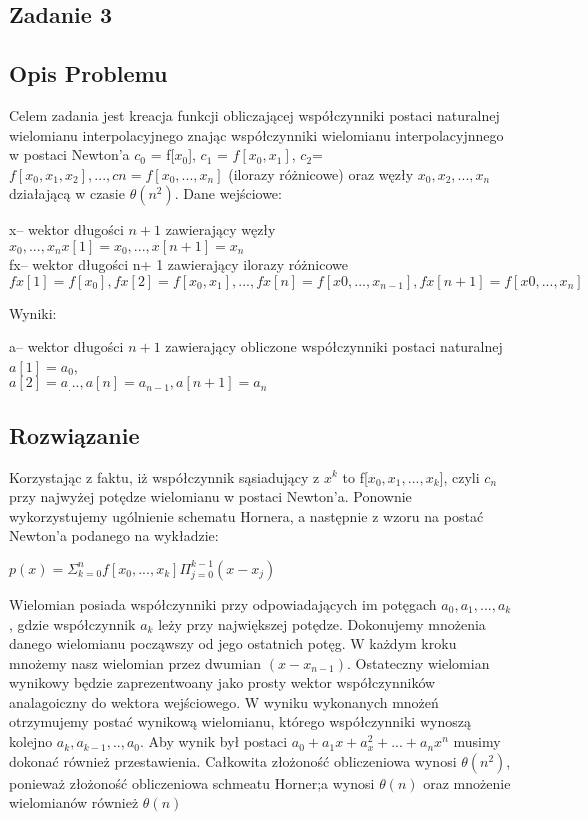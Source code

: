 \documentclass[11pt]{article}
\begin{document}
\begin{flushleft}
\section{Zadanie 3}
\subsection{Opis Problemu}
Celem zadania jest kreacja funkcji obliczającej współczynniki postaci naturalnej wielomianu interpolacyjnego znając współczynniki wielomianu interpolacyjnnego w postaci Newton'a $c_0$ = f[$x_0$], $c_1$ = $f[x_0,x_1]$, $c_2$= $f[x_0, x_1, x_2],. . .,cn=f[x_0, . . . , x_n]$ (ilorazy różnicowe) oraz węzły $ x_0, x_2, . . . , x_n $ działającą w czasie $\theta(n^2)$. Dane wejściowe:\\
\begin{center}
x– wektor długości $n+ 1 $ zawierający węzły $x_0, . . . , x_n x[1]=x_0,...,x[n+1]=x_n$ \\
fx– wektor długości n+ 1 zawierający ilorazy różnicowe $fx[1]=f[x_0],fx[2]=f[x_0, x_1],...,fx[n]=f[x0, . . . , x_{n−1}],fx[n+1]=f[x0, . . . , x_n]$\\
\begin{flushleft}
Wyniki:\\
\end{flushleft}
a– wektor długości $n+ 1 $ zawierający obliczone współczynniki postaci naturalnej\\
$a[1]=a_0$,\\
$a[2]=a_...,a[n]=a_{n−1},a[n+1]=a_n$
\end{center}
\bigskip
\subsection{Rozwiązanie}
\bigskip
Korzystając z faktu, iż współczynnik sąsiadujący z $x^k$ to f[$x_0,x_1,...,x_k$], czyli $c_n$ przy najwyżej potędze wielomianu w postaci Newton'a. Ponownie wykorzystujemy ugólnienie schematu Hornera, a następnie z wzoru na postać Newton'a podanego na  wykładzie: \\
\begin{center}
\bigskip
$p(x) = \Sigma^n_{k=0} f[x_0,...,x_k] \Pi^{k-1}_{j=0}(x-x_j)$\\
\bigskip
\end{center}
Wielomian posiada współczynniki przy odpowiadających im potęgach $a_0,a_1,...,a_k$, gdzie współczynnik $a_k$ leży przy największej potędze. Dokonujemy mnożenia danego wielomianu począwszy od jego ostatnich potęg. W każdym kroku mnożemy nasz  wielomian przez dwumian $(x-x_{n-1})$. Ostateczny wielomian wynikowy będzie zaprezentwoany jako prosty wektor współczynników analagoiczny do wektora wejściowego. W wyniku wykonanych mnożeń otrzymujemy postać wynikową wielomianu, którego współczynniki wynoszą kolejno $a_k,a_{k-1},..,a_0$. Aby wynik był postaci $a_0+a_1x+a_x^2+...+a_nx^n$ musimy dokonać również przestawienia. Całkowita złożoność obliczeniowa wynosi $\theta(n^2)$, ponieważ złożoność obliczeniowa schmeatu Horner;a wynosi $\theta(n)$ oraz mnożenie wielomianów również $\theta(n)$
\newpage

\end{flushleft}
\end{document}
